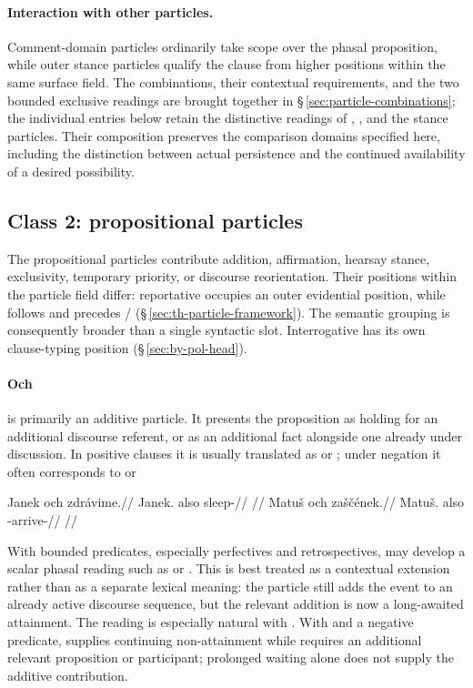 \paragraph{Interaction with other particles.}
Comment-domain particles ordinarily take scope over the phasal proposition,
while outer stance particles qualify the clause from higher positions within
the same surface field. The
combinations, their contextual requirements, and the two bounded exclusive
readings are brought together in §\,\ref{sec:particle-combinations}; the
individual entries below retain the distinctive readings of ,
, and the stance particles. Their composition preserves the
comparison domains specified here, including the distinction between actual
persistence and the continued availability of a desired possibility.

\subsection{Class 2: propositional particles}\label{sec:class2-particles}

The propositional particles contribute addition, affirmation, hearsay stance,
exclusivity, temporary priority, or discourse reorientation. Their positions
within the particle field differ: reportative  occupies an outer
evidential position, while  follows  and precedes
/ (§\,\ref{sec:th-particle-framework}). The semantic
grouping is consequently broader than a single syntactic slot. Interrogative
 has its own clause-typing
position (§\,\ref{sec:by-pol-head}).

\paragraph{Och}  is primarily an additive particle. It presents the
proposition as holding for an additional discourse referent, or as an
additional fact alongside one already under discussion. In positive clauses it
is usually translated as  or ; under negation it often
corresponds to  or 

\pex
\a
\begingl
\gla Janek och zdrávime.//
\glb Janek.\Dir{} also sleep-\Prog{}//
\glft {}//
\endgl
\a
\begingl
\gla Matuš och zaščének.//
\glb Matuš.\Dir{} also \Neg{}-arrive-\Pf{}//
\glft {}//
\endgl
\xe

With bounded predicates, especially perfectives and retrospectives,
 may develop a scalar phasal reading such as  or
. This is best treated as a contextual extension rather than as a
separate lexical meaning: the particle still adds the event to an already
active discourse sequence, but the relevant addition is now a long-awaited
attainment. The reading is especially natural with . With  and a
negative predicate,  supplies continuing non-attainment while
 requires an additional relevant proposition or participant; prolonged
waiting alone does not supply the additive contribution.

